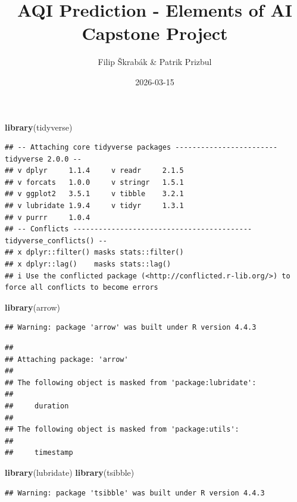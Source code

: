 \documentclass[
]{article}
\title{AQI Prediction - Elements of AI Capstone Project}
\author{Filip Škrabák \& Patrik Prizbul}
\date{2026-03-15}
\newenvironment{Shaded}{\begin{snugshade}}{\end{snugshade}}
\newcommand{\FunctionTok}[1]{\textcolor[rgb]{0.13,0.29,0.53}{\textbf{#1}}}
\newcommand{\NormalTok}[1]{#1}
\begin{document}
\maketitle

\begin{Shaded}
\begin{Highlighting}[]
\FunctionTok{library}\NormalTok{(tidyverse)}
\end{Highlighting}
\end{Shaded}

\begin{verbatim}
## -- Attaching core tidyverse packages ------------------------ tidyverse 2.0.0 --
## v dplyr     1.1.4     v readr     2.1.5
## v forcats   1.0.0     v stringr   1.5.1
## v ggplot2   3.5.1     v tibble    3.2.1
## v lubridate 1.9.4     v tidyr     1.3.1
## v purrr     1.0.4     
## -- Conflicts ------------------------------------------ tidyverse_conflicts() --
## x dplyr::filter() masks stats::filter()
## x dplyr::lag()    masks stats::lag()
## i Use the conflicted package (<http://conflicted.r-lib.org/>) to force all conflicts to become errors
\end{verbatim}

\begin{Shaded}
\begin{Highlighting}[]
\FunctionTok{library}\NormalTok{(arrow)}
\end{Highlighting}
\end{Shaded}

\begin{verbatim}
## Warning: package 'arrow' was built under R version 4.4.3
\end{verbatim}

\begin{verbatim}
## 
## Attaching package: 'arrow'
## 
## The following object is masked from 'package:lubridate':
## 
##     duration
## 
## The following object is masked from 'package:utils':
## 
##     timestamp
\end{verbatim}

\begin{Shaded}
\begin{Highlighting}[]
\FunctionTok{library}\NormalTok{(lubridate)}
\FunctionTok{library}\NormalTok{(tsibble)}
\end{Highlighting}
\end{Shaded}

\begin{verbatim}
## Warning: package 'tsibble' was built under R version 4.4.3
\end{verbatim}
\end{document}
